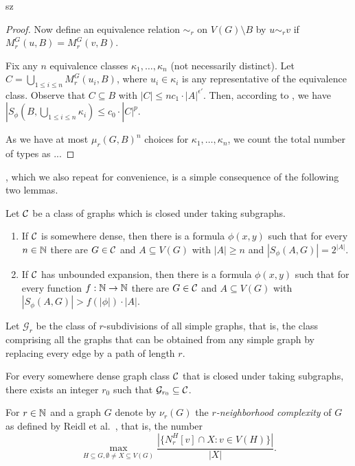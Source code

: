\begin{change}{sz}
\begin{proof}
Now define an equivalence relation $\sim_r$ on 
$V(G)\setminus B$ by $u\sim_r v$ if 
$M_r^G(u,B)=M_r^G(v,B)$. 

Fix any $n$ equivalence
classes $\kappa_1,\ldots, \kappa_n$ (not necessarily
distinct). Let $C=\bigcup_{1\leq i\leq n}M_r^G(u_i, B)$, 
where $u_i\in \kappa_i$ is any representative of the
equivalence class. Observe that $C\subseteq B$ with
$|C|\leq nc_1\cdot |A|^{\epsilon'}$. 
Then, according to , 
we have $|S_\phi(B,\bigcup_{1\leq i\leq n}\kappa_i)\leq
c_0\cdot |C|^p$. 

As we have at most $\mu_r(G,B)^n$ choices for 
$\kappa_1,\ldots, \kappa_n$, we count the total 
number of types as ... 

\end{proof}

\end{change}

, which we also repeat for
convenience, is a simple consequence of the following two
lemmas. 

\begin{theorem}
Let $\mathcal{C}$ be a class of graphs which 
is closed under taking subgraphs. 
\begin{enumerate}
\item If $\mathcal{C}$ is somewhere dense, then there is a formula 
$\phi(x,y)$ such that for every $n\in \mathbb{N}$ there are $G\in\mathcal{C}$ and $A\subseteq V(G)$ 
with $|A|\geq n$ and $|S_\phi(A,G)|=2^{|A|}$. 
\item If $\mathcal{C}$ has unbounded expansion, then there is a formula 
$\phi(x,y)$ such that for every function $f:\mathbb{N}\rightarrow \mathbb{N}$ 
there are $G\in\mathcal{C}$ and $A\subseteq V(G)$ 
with $|S_\phi(A,G)|>f(|\phi|)\cdot |A|$. 
\end{enumerate}
\end{theorem}

Let $\mathcal{G}_r$ be the class of $r$-subdivisions of all 
simple graphs, that is, the class comprising
all the graphs that can be obtained from any simple graph by replacing every edge by a path of
length $r$.

\begin{lemma}\label{lem:lower-nd}
For every somewhere dense graph class $\mathcal{C}$ that is closed 
under taking subgraphs, there
exists an integer $r_0$ such that $\mathcal{G}_{r_0}\subseteq \mathcal{C}$.
\end{lemma}

For $r\in \mathbb{N}$ and a graph $G$ denote by $\nu_r(G)$ the
\emph{$r$-neighborhood complexity} of $G$ as defined
by Reidl et al.~\cite{reidl2016characterising}, that is, the number 
\[\max_{H\subseteq G,\emptyset\neq X\subseteq V(G)}\frac{|\{N_r^H[v]\cap X : v\in V(H)\}|}{|X|}.\] 

